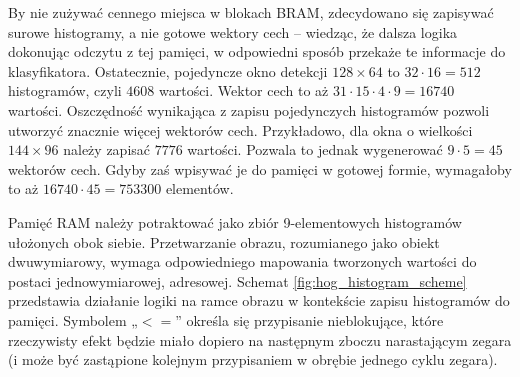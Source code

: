 By nie zużywać cennego miejsca w blokach BRAM, zdecydowano się zapisywać surowe histogramy, a nie gotowe wektory cech -- wiedząc, że dalsza logika dokonując odczytu z tej pamięci, w odpowiedni sposób przekaże te informacje do klasyfikatora. %
Ostatecznie, pojedyncze okno detekcji $128\times 64$ to $32\cdot16=512$ histogramów, czyli $4608$ wartości. 
Wektor cech to aż $31\cdot15\cdot4\cdot9=16740$ wartości. %
Oszczędność wynikająca z zapisu pojedynczych histogramów pozwoli utworzyć znacznie więcej wektorów cech. 
Przykładowo, dla okna o wielkości $144\times 96$ należy zapisać $7776$ wartości. 
Pozwala to jednak wygenerować $9\cdot5=45$ wektorów cech. 
Gdyby zaś wpisywać je do pamięci w gotowej formie, wymagałoby to aż $16740\cdot45=753300$ elementów. %

Pamięć RAM należy potraktować jako zbiór 9-elementowych histogramów ułożonych obok siebie. 
Przetwarzanie obrazu, rozumianego jako obiekt dwuwymiarowy, wymaga odpowiedniego mapowania tworzonych wartości do postaci jednowymiarowej, adresowej. 
Schemat \ref{fig:hog_histogram_scheme} przedstawia działanie logiki na ramce obrazu w kontekście zapisu histogramów do pamięci. %
Symbolem „$<=$” określa się przypisanie nieblokujące, które rzeczywisty efekt będzie miało dopiero na następnym zboczu narastającym zegara (i może być zastąpione kolejnym przypisaniem w obrębie jednego cyklu zegara).
 
